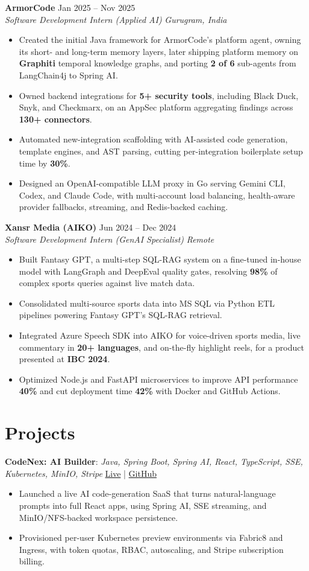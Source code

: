 \documentclass[letterpaper,10pt]{article}
\newcommand{\resumeItem}[1]{\item\footnotesize{#1}}
\newcommand{\resumeRole}[4]{
  \textbf{#1} \hfill #2\\
  \textit{#3} \hfill \textit{#4}
}
\begin{document}
\resumeRole{ArmorCode}{Jan 2025 -- Nov 2025}{Software Development Intern (Applied AI)}{Gurugram, India}
\begin{itemize}[leftmargin=0.16in, itemsep=0pt, topsep=1pt]
  \resumeItem{Created the initial Java framework for ArmorCode's platform agent, owning its short- and long-term memory layers, later shipping platform memory on \textbf{Graphiti} temporal knowledge graphs, and porting \textbf{2 of 6} sub-agents from LangChain4j to Spring AI.}
  \resumeItem{Owned backend integrations for \textbf{5+ security tools}, including Black Duck, Snyk, and Checkmarx, on an AppSec platform aggregating findings across \textbf{130+ connectors}.}
  \resumeItem{Automated new-integration scaffolding with AI-assisted code generation, template engines, and AST parsing, cutting per-integration boilerplate setup time by \textbf{30\%}.}
  \resumeItem{Designed an OpenAI-compatible LLM proxy in Go serving Gemini CLI, Codex, and Claude Code, with multi-account load balancing, health-aware provider fallbacks, streaming, and Redis-backed caching.}
\end{itemize}

\resumeRole{Xansr Media (AIKO)}{Jun 2024 -- Dec 2024}{Software Development Intern (GenAI Specialist)}{Remote}
\begin{itemize}[leftmargin=0.16in, itemsep=0pt, topsep=1pt]
  \resumeItem{Built Fantasy GPT, a multi-step SQL-RAG system on a fine-tuned in-house model with LangGraph and DeepEval quality gates, resolving \textbf{98\%} of complex sports queries against live match data.}
  \resumeItem{Consolidated multi-source sports data into MS SQL via Python ETL pipelines powering Fantasy GPT's SQL-RAG retrieval.}
  \resumeItem{Integrated Azure Speech SDK into AIKO for voice-driven sports media, live commentary in \textbf{20+ languages}, and on-the-fly highlight reels, for a product presented at \textbf{IBC 2024}.}
  \resumeItem{Optimized Node.js and FastAPI microservices to improve API performance \textbf{40\%} and cut deployment time \textbf{42\%} with Docker and GitHub Actions.}
\end{itemize}


\section{Projects}
\textbf{CodeNex: AI Builder}: \textit{Java, Spring Boot, Spring AI, React, TypeScript, SSE, Kubernetes, MinIO, Stripe} \hfill \href{https://www.codenex.dev/}{Live} | \href{https://github.com/Nikunj2003/Codenex-backend-v1}{GitHub}
\begin{itemize}[leftmargin=0.16in, itemsep=0pt, topsep=1pt]
  \resumeItem{Launched a live AI code-generation SaaS that turns natural-language prompts into full React apps, using Spring AI, SSE streaming, and MinIO/NFS-backed workspace persistence.}
  \resumeItem{Provisioned per-user Kubernetes preview environments via Fabric8 and Ingress, with token quotas, RBAC, autoscaling, and Stripe subscription billing.}
\end{itemize}
\end{document}
